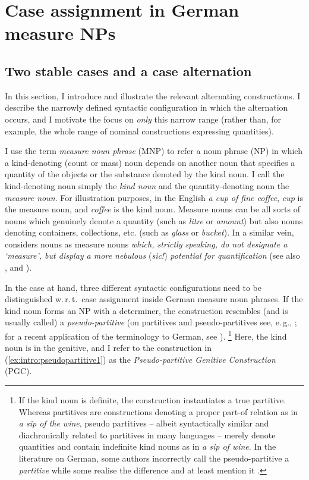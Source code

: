 \documentclass[USenglish]{article}
\newcommand{\wrt}{w.\,r.\,t.\ }
\begin{document}
\section{Case assignment in German measure NPs}
\label{sec:germanmeasurenps}


\subsection{Two stable cases and a case alternation}
\label{sec:descriptive}

In this section, I introduce and illustrate the relevant alternating constructions.
I describe the narrowly defined syntactic configuration in which the alternation occurs, and I motivate the focus on \textit{only} this narrow range (rather than, for example, the whole range of nominal constructions expressing quantities).

I use the term \textit{measure noun phrase} (MNP) to refer a noun phrase (NP) in which a kind-denoting (count or mass) noun depends on another noun that specifies a quantity of the objects or the substance denoted by the kind noun.
I call the kind-denoting noun simply the \textit{kind noun} and the quantity-denoting noun the \textit{measure noun}.
For illustration purposes, in the English \textit{a cup of fine coffee}, \textit{cup} is the measure noun, and \textit{coffee} is the kind noun.
Measure nouns can be all sorts of nouns which genuinely denote a quantity (such as \textit{litre} or \textit{amount}) but also nouns denoting containers, collections, etc. (such as \textit{glass} or \textit{bucket}).
In a similar vein, \citet[284]{Brems2003} considers nouns as measure nouns \textit{which, strictly speaking, do not designate a `measure', but display a more nebulous} (\textit{sic!}) \textit{potential for quantification} (see also \citealp[530]{Koptjevskaja2001}, and \citealp[338]{Rutkowski2007}).

In the case at hand, three different syntactic configurations need to be distinguished \wrt case assignment inside German measure noun phrases.
If the kind noun forms an NP with a determiner, the construction resembles (and is usually called) a \textit{pseudo-partitive} (on partitives and pseudo-partitives see, e.\,g., \citealp{Barker1998,Selkirk1977,Stickney2007,Vos1999}; for a recent application of the terminology to German, see \citealp{Gerstenberger2015}).%
\footnote{If the kind noun is definite, the construction instantiates a true partitive.
Whereas partitives are constructions denoting a proper part-of relation as in \textit{a sip of the wine}, pseudo partitives -- albeit syntactically similar and diachronically related to partitives in many languages -- merely denote quantities and contain indefinite kind nouns as in \textit{a sip of wine}.%
In the literature on German, some authors incorrectly call the pseudo-partitive a \textit{partitive} \cite{Hentschel1993} while some realise the difference and at least mention it \citep{Eschenbach1994,GallmannLindauer1994,Loebel1989,Zimmer2015}.
}
Here, the kind noun is in the genitive, and I refer to the construction in (\ref{ex:intro:pseudopartitive1}) as the \textit{Pseudo-partitive Genitive Construction} (PGC).
\end{document}
